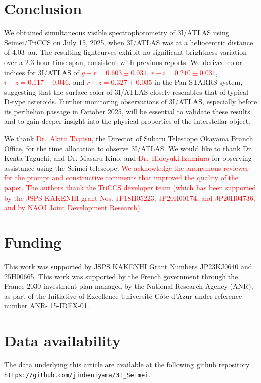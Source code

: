 \documentclass[]{pasj02}
\newcommand{\RED}[1]{\textcolor{red}{#1}}
\newcommand\I{3I/ATLAS\xspace}
\newcommand\gr{\RED{$g-r=0.603\pm0.031$}\xspace}
\newcommand\ri{\RED{$r-i=0.210\pm0.031$}\xspace}
\newcommand\iz{\RED{$i-z=0.117\pm0.046$}\xspace}
\newcommand\rz{\RED{$r-z=0.327\pm0.035$}\xspace}
\begin{document}
\section{Conclusion}\label{sec:conc}
We obtained simultaneous visible spectrophotometry of \I using Seimei/TriCCS on July 15, 2025, when \I was at a heliocentric distance of 4.03~au.
The resulting lightcurves exhibit no significant brightness variation over a 2.3-hour time span, consistent with previous reports.
We derived color indices for \I of 
\gr, \ri, \iz, and \rz in the Pan-STARRS system,
suggesting that the surface color of \I closely resembles that of typical D-type asteroids.
Further monitoring observations of \I, 
especially before its perihelion passage in October 2025, will be essential to validate these results and to gain deeper insight into the physical properties of the interstellar object.

\begin{ack}
We thank \RED{Dr.~Akito Tajitsu}, the Director of Subaru Telescope Okayama Branch Office, 
for the time allocation to observe \I.
We would like to thank Dr. Kenta Taguchi, and Dr. Masaru Kino,
and \RED{Dr.~Hideyuki Izumiura} for observing assistance using the Seimei telescope.
\RED{
    We acknowledge the anonymous reviewer for the prompt and constructive comments 
    that improved the quality of the paper.
    }
\RED{
    The authors thank the TriCCS developer team (which has been
    supported by the JSPS KAKENHI grant Nos. JP18H05223, JP20H00174, and
    JP20H04736, and by NAOJ Joint Development Research)
    }
\end{ack}

\section*{Funding}
This work was supported by JSPS KAKENHI Grant Numbers JP23KJ0640 and 25H00665. 
This work was supported by the French government through the France 2030 
investment plan managed by the National Research Agency (ANR), as part of the
Initiative of Excellence Université Côte d’Azur under reference number ANR- 15-IDEX-01.

\section*{Data availability} 
The data underlying this article are available at the following 
github repository \texttt{https://github.com/jinbeniyama/3I\_Seimei}.




\end{document}
